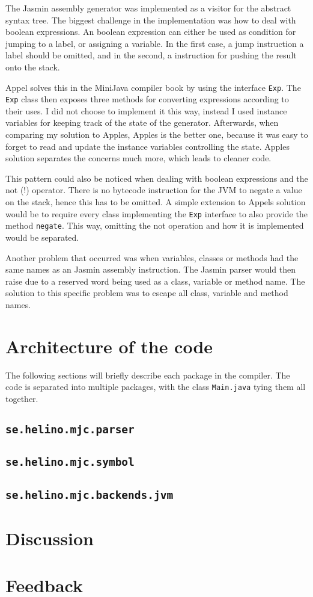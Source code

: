 \documentclass[11pt,oneside,a4paper]{article}
\begin{document}
The Jasmin assembly generator was implemented as a visitor for the abstract
syntax tree. The biggest challenge in the implementation was how to deal with
boolean expressions. An boolean expression can either be used as condition for
jumping to a label, or assigning a variable. In the first case, a jump
instruction a label should be omitted, and in the second, a instruction for
pushing the result onto the stack.

Appel solves this in the MiniJava compiler book by using the interface
\texttt{Exp}. The \texttt{Exp} class then exposes three methods for converting
expressions according to their uses. 
I did not choose to implement it this way, instead I used instance variables
for keeping track of the state of the generator. Afterwards, when comparing my
solution to Apples, Apples is the better one, because it was easy to forget to
read and update the instance variables controlling the state. Apples solution
separates the concerns much more, which leads to cleaner code.

This pattern could also be noticed when dealing with boolean expressions and
the not (!) operator. There is no bytecode instruction for the JVM to negate a
value on the stack, hence this has to be omitted. A simple extension to Appels
solution would be to require every class implementing the \texttt{Exp}
interface to also provide the method \texttt{negate}. This way, omitting the
not operation and how it is implemented would be separated.

Another problem that occurred was when variables, classes or methods had the
same names as an Jasmin assembly instruction. The Jasmin parser would then
raise due to a reserved word being used as a class, variable or method name. The
solution to this specific problem was to escape all class, variable and method
names.
\section{Architecture of the code}
The following sections will briefly describe each package in the compiler. The
code is separated into multiple packages, with the class \texttt{Main.java}
tying them all together.
\subsection{\texttt{se.helino.mjc.parser}}
\subsection{\texttt{se.helino.mjc.symbol}}
\subsection{\texttt{se.helino.mjc.backends.jvm}}
\section{Discussion}
\label{sec:discussion}
\appendix
\section{Feedback}
\end{document}
